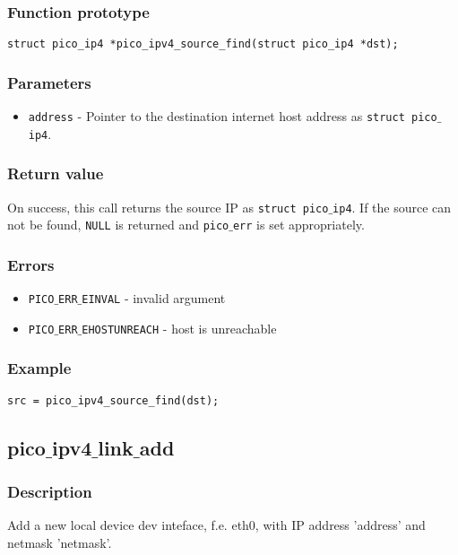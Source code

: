 \subsubsection*{Function prototype}
\begin{verbatim}
struct pico_ip4 *pico_ipv4_source_find(struct pico_ip4 *dst);
\end{verbatim}

\subsubsection*{Parameters}
\begin{itemize}[noitemsep]
\item \texttt{address} - Pointer to the destination internet host address as \texttt{struct pico$\_$ip4}.
\end{itemize}

\subsubsection*{Return value}
On success, this call returns the source IP as \texttt{struct pico$\_$ip4}.
If the source can not be found, \texttt{NULL} is returned and \texttt{pico$\_$err} is set appropriately.

\subsubsection*{Errors}
\begin{itemize}[noitemsep]
\item \texttt{PICO$\_$ERR$\_$EINVAL} - invalid argument
\item \texttt{PICO$\_$ERR$\_$EHOSTUNREACH} - host is unreachable
\end{itemize}

\subsubsection*{Example}
\begin{verbatim}
src = pico_ipv4_source_find(dst);
\end{verbatim}




\subsection{pico$\_$ipv4$\_$link$\_$add }

\subsubsection*{Description}
Add a new local device dev inteface, f.e. eth0, with IP address 'address' and netmask 'netmask'.

